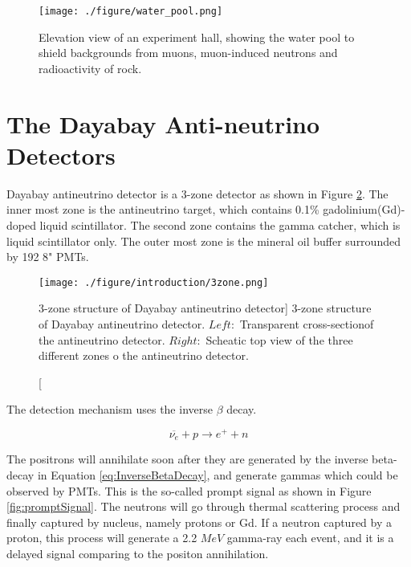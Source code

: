 \begin{figure}
    \centering
    \texttt{[image: ./figure/water\_pool.png]}
    \caption{Elevation view of an experiment hall,
showing the water pool to shield backgrounds from muons, muon-induced neutrons and radioactivity of rock.}
    \label{fig:water_pool.png}
    \end{figure}







\section{The Dayabay Anti-neutrino Detectors}
\label{sec:AD}

Dayabay antineutrino detector is a 3-zone detector as shown in Figure \ref{fig:3zone.png}.
The inner most zone is the antineutrino target, which
contains 0.1\% gadolinium(Gd)-doped liquid scintillator. The second zone
contains the gamma catcher, which is liquid scintillator only.
The outer most zone is the mineral oil buffer surrounded by 192 8" PMTs.


\begin{figure}
    \centering
    \texttt{[image: ./figure/introduction/3zone.png]}
    \caption
    [3-zone structure of Dayabay antineutrino detector]
    {3-zone structure of Dayabay antineutrino detector. $Left:$ Transparent cross-sectionof the antineutrino detector.
$Right:$ Scheatic top view of the three different zones o the antineutrino detector.}
    \label{fig:3zone.png}
    \end{figure}


The detection mechanism uses the inverse $\beta$ decay.


\begin{equation}
\overline{\nu_e} + p \rightarrow e^+ + n
\label{eq:InverseBetaDecay}
\end{equation}


The positrons will annihilate soon after they are generated by the inverse beta-decay in Equation \ref{eq:InverseBetaDecay},
and generate gammas which could be observed by PMTs.
This is the so-called prompt signal as shown in Figure \ref{fig:promptSignal}.
The neutrons will go through
thermal scattering process and finally captured by nucleus, namely protons or Gd.
If a neutron captured by a proton, this process will generate a 2.2 $MeV$ gamma-ray each event, and it is a delayed signal comparing
to the positon annihilation.


